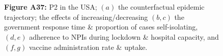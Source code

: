 \documentclass[paper=a4,fontsize=11pt]{article}
\begin{document}
\begin{figure}[!h]
  \\
  \hspace{1.76cm}
  \\
  \caption*{\textbf{Figure A37:} P2 in the USA; $(a)$ the counterfactual epidemic trajectory; the effects of increasing/decreasing $(b,c)$ the government response time \& proportion of cases self-isolating, $(d,e)$ adherence to NPIs during lockdown \& hospital capacity, and $(f,g)$ vaccine administration rate \& uptake.}
\end{figure}
\end{document}

